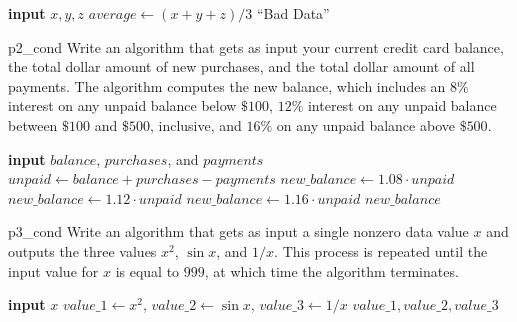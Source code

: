 \begin{algorithm}
	\caption*{Algorithm for problem ~\ref{prob:p1_cond}}
	\begin{algorithmic}
		\State \textbf{input} $x, y, z$
			\State $average \gets (x + y + z)/3$
		\Else 
			\State \Output ``Bad Data''
		\EndIf
	\end{algorithmic}
\end{algorithm}

\begin{problem}{}{p2_cond}
Write an algorithm that gets as input your current credit card balance, the total dollar amount of new purchases, and the total dollar amount of all payments. The algorithm computes the new balance, which includes an $8\%$ interest on any unpaid balance below $\$100$, $12\%$ interest on any unpaid balance between $\$100$ and $\$500$, inclusive, and $16\%$ on any unpaid balance above $\$500$.
\end{problem}

\begin{algorithm}[H]
	\caption*{Algorithm for Problem ~\ref{prob:p2_cond}}
	\begin{algorithmic}
		\State \textbf{input} $balance$, $purchases$, and $payments$
		\State $unpaid \gets balance + purchases - payments$
		\If{$unpaid < 100$}
			\State $new\_balance\gets 1.08\cdot unpaid$
		\ElsIf{$100 \leq unpaid \leq 500$}
			\State $new\_balance\gets 1.12\cdot unpaid$
		\Else
			\State $new\_balance\gets 1.16\cdot unpaid$
		\EndIf
		\State \Output $new\_balance$
	\end{algorithmic}
\end{algorithm}

\begin{problem}{}{p3_cond}
Write an algorithm that gets as input a single nonzero data value $x$ and outputs the three values $x^2$, $\sin x$, and $1/x$. This process is repeated until the input value for $x$ is equal to $999$, at which time the algorithm terminates. 
\end{problem}

\begin{algorithm}[H]
	\caption*{Algorithm for Problem ~\ref{prob:p3_cond}}
	\begin{algorithmic}
		\Repeat
			\State \textbf{input} $x$
			\State $value\_1 \gets x^2$, $value\_2 \gets \sin x$, $value\_3\gets 1/x$ 
			\State \Output $value\_1, value\_2, value\_3$
		\Until{$x=999$}
	\end{algorithmic}
\end{algorithm}
